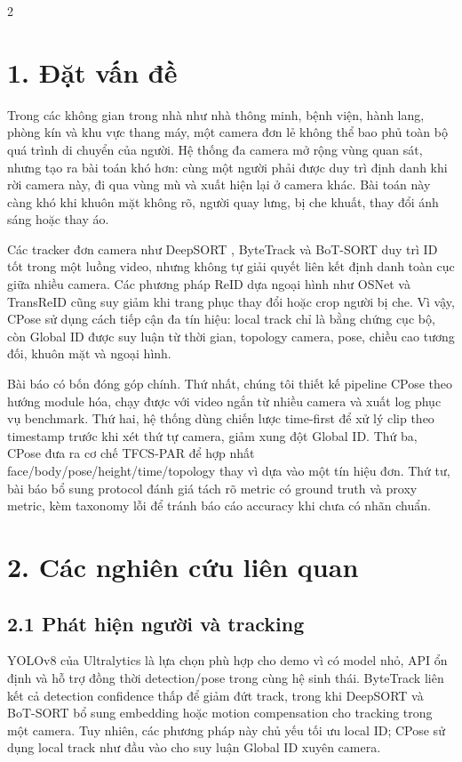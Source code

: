 \documentclass[a4paper, twoside, 10pt]{article}
\begin{document}
\begin{multicols}{2}

\section*{1. Đặt vấn đề}
Trong các không gian trong nhà như nhà thông minh, bệnh viện, hành lang, phòng kín và khu vực thang máy, một camera đơn lẻ không thể bao phủ toàn bộ quá trình di chuyển của người. Hệ thống đa camera mở rộng vùng quan sát, nhưng tạo ra bài toán khó hơn: cùng một người phải được duy trì định danh khi rời camera này, đi qua vùng mù và xuất hiện lại ở camera khác. Bài toán này càng khó khi khuôn mặt không rõ, người quay lưng, bị che khuất, thay đổi ánh sáng hoặc thay áo.

Các tracker đơn camera như DeepSORT \cite{key25}, ByteTrack \cite{key26} và BoT-SORT \cite{key38} duy trì ID tốt trong một luồng video, nhưng không tự giải quyết liên kết định danh toàn cục giữa nhiều camera. Các phương pháp ReID dựa ngoại hình như OSNet \cite{key34} và TransReID \cite{key35} cũng suy giảm khi trang phục thay đổi hoặc crop người bị che. Vì vậy, CPose sử dụng cách tiếp cận đa tín hiệu: local track chỉ là bằng chứng cục bộ, còn Global ID được suy luận từ thời gian, topology camera, pose, chiều cao tương đối, khuôn mặt và ngoại hình.

Bài báo có bốn đóng góp chính. Thứ nhất, chúng tôi thiết kế pipeline CPose theo hướng module hóa, chạy được với video ngắn từ nhiều camera và xuất log phục vụ benchmark. Thứ hai, hệ thống dùng chiến lược time-first để xử lý clip theo timestamp trước khi xét thứ tự camera, giảm xung đột Global ID. Thứ ba, CPose đưa ra cơ chế TFCS-PAR để hợp nhất face/body/pose/height/time/topology thay vì dựa vào một tín hiệu đơn. Thứ tư, bài báo bổ sung protocol đánh giá tách rõ metric có ground truth và proxy metric, kèm taxonomy lỗi để tránh báo cáo accuracy khi chưa có nhãn chuẩn.

\section*{2. Các nghiên cứu liên quan}
\subsection*{2.1 Phát hiện người và tracking}
YOLOv8 của Ultralytics \cite{key2} là lựa chọn phù hợp cho demo vì có model nhỏ, API ổn định và hỗ trợ đồng thời detection/pose trong cùng hệ sinh thái. ByteTrack \cite{key26} liên kết cả detection confidence thấp để giảm đứt track, trong khi DeepSORT \cite{key25} và BoT-SORT \cite{key38} bổ sung embedding hoặc motion compensation cho tracking trong một camera. Tuy nhiên, các phương pháp này chủ yếu tối ưu local ID; CPose sử dụng local track như đầu vào cho suy luận Global ID xuyên camera.


\end{multicols}
\end{document}
